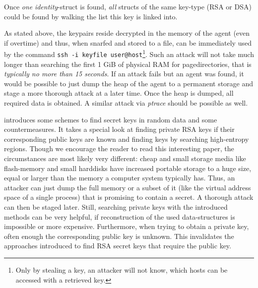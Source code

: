 Once \emph{one} \emph{identity}-struct is found, \emph{all} structs of the same
key-type (RSA or DSA) could be found by walking the list this key is linked
into.

As stated above, the keypairs reside decrypted in the memory of the agent (even
if overtime) and thus, when snarfed and stored to a file, can be immediately
used by the command \texttt{ssh~-i~keyfile~user@host}\footnote{Only by stealing
a key, an attacker will not know, which hosts can be accessed with a retrieved
key.}.  Such an attack will not take much longer than searching the first 1 GiB
of physical RAM for pagedirectories, that is \emph{typically no more than 15
seconds}. If an attack fails but an agent was found, it would be possible to
just dump the heap of the agent to a permanent storage and stage a more thorough
attack at a later time. Once the heap is dumped, all required data is obtained.
A similar attack via \emph{ptrace} should be possible as well.




\cite{hide_n_seek:1998} introduces some schemes to find secret keys in random
data and some countermeasures. It takes a special look at finding private RSA
keys if their corresponding public keys are known and finding keys by searching
high-entropy regions. Though we encourage the reader to read this interesting
paper, the circumstances are most likely very different: cheap and small storage
media like flash-memory and small harddisks have increased portable storage to a
huge size, equal or larger than the memory a computer system typically has.
Thus, an attacker can just dump the full memory or a subset of it (like the
virtual address space of a single process) that is promising to contain a
secret. A thorough attack can then be staged later.  Still, searching private
keys with the introduced methods can be very helpful, if reconstruction of the
used data-structures is impossible or more expensive. Furthermore, when trying
to obtain a private key, often enough the corresponding public key is unknown.
This invalidates the approaches introduced to find RSA secret keys that require
the public key.




